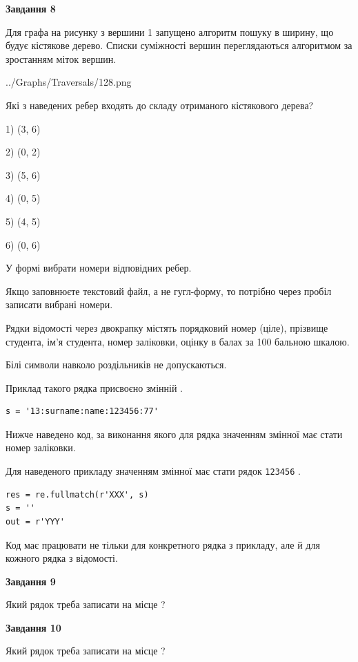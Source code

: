 \documentclass[12pt, ukrainian]{article}
\def\code#1{\Verb!#1!}
\begin{document}
{\begin {large}
{\begin {center}\textbf{Завдання 8}\end {center}}\par
Для графа на рисунку з вершини 1 запущено алгоритм пошуку в ширину, що будує кістякове дерево. Списки суміжності вершин переглядаються алгоритмом за зростанням міток вершин.\par
\begin{center}
	{../Graphs/Traversals/128.png}
\end{center}
\par Які з наведених ребер входять до складу отриманого кістякового дерева?\par
1) (3, 6)\par
2) (0, 2)\par
3) (5, 6)\par
4) (0, 5)\par
5) (4, 5)\par
6) (0, 6)\par
{\vskip 15pt} У формі вибрати номери відповідних ребер.


Якщо заповнюєте текстовий файл, а не гугл-форму, то потрібно через пробіл записа\-ти вибрані номери.\par
\newpage


Рядки відомості через двокрапку містять порядковий номер (ціле), пріз\-ви\-ще студен\-та, ім'я студента, номер заліковки, оцінку в балах за 100 бальною шкалою.

Білі символи навколо роздільників не допускаються.

Приклад такого рядка присвоєно змінній .



\begin{verbatim}
s = '13:surname:name:123456:77'
\end{verbatim}


Нижче наведено код, за виконання якого для рядка  значенням змінної  має стати номер заліковки.

Для наведеного прикладу значенням змінної  має стати рядок \code{123456} .



\begin{verbatim}
res = re.fullmatch(r'XXX', s)
s = ''
out = r'YYY'
\end{verbatim}


Код має працювати не тільки для конкретного рядка з прикладу, але й для кожного рядка з відомості.

{\begin {center}\textbf{Завдання 9}\end {center}}\par
Який рядок треба записати на місце  ?\par
\vspace{5mm}


{\begin {center}\textbf{Завдання 10}\end {center}}\par
Який рядок треба записати на місце  ?\par


\newpage


\end {large}}
\end{document}
